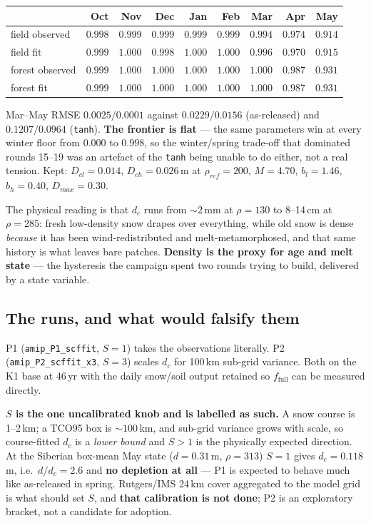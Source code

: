 \documentclass[10pt]{article}
\begin{document}
\begin{center}\footnotesize
\begin{tabular}{l r r r r r r r r}
\toprule
 & Oct & Nov & Dec & Jan & Feb & Mar & Apr & \textbf{May} \\
\midrule
field observed & $0.998$ & $0.999$ & $0.999$ & $0.999$ & $0.999$ & $0.994$ & $0.974$ & $\mathbf{0.914}$ \\
field fit & $0.999$ & $1.000$ & $0.998$ & $1.000$ & $1.000$ & $0.996$ & $0.970$ & $\mathbf{0.915}$ \\
forest observed & $0.999$ & $1.000$ & $1.000$ & $1.000$ & $1.000$ & $1.000$ & $0.987$ & $\mathbf{0.931}$ \\
forest fit & $0.999$ & $1.000$ & $1.000$ & $1.000$ & $1.000$ & $1.000$ & $0.987$ & $\mathbf{0.931}$ \\
\bottomrule
\end{tabular}
\end{center}

\noindent Mar--May RMSE $0.0025/0.0001$ against $0.0229/0.0156$ (as-released) and
$0.1207/0.0964$ (\texttt{tanh}). \textbf{The frontier is flat} --- the same parameters win at
every winter floor from $0.000$ to $0.998$, so the winter/spring trade-off that dominated
rounds 15--19 was an artefact of the \texttt{tanh} being unable to do either, not a real
tension. Kept: $D_{cl}=0.014$, $D_{ch}=0.026$\,m at $\rho_{ref}=200$, $M=4.70$, $b_l=1.46$,
$b_h=0.40$, $D_{max}=0.30$.

The physical reading is that $d_c$ runs from ${\sim}2$\,mm at $\rho=130$ to 8--14\,cm at
$\rho=285$: fresh low-density snow drapes over everything, while old snow is dense
\emph{because} it has been wind-redistributed and melt-metamorphosed, and that same history is
what leaves bare patches. \textbf{Density is the proxy for age and melt state} --- the
hysteresis the campaign spent two rounds trying to build, delivered by a state variable.

\subsection{The runs, and what would falsify them}\label{sub:r20runs}
P1 (\texttt{amip\_P1\_scffit}, $S=1$) takes the observations literally. P2
(\texttt{amip\_P2\_scffit\_x3}, $S=3$) scales $d_c$ for 100\,km sub-grid variance. Both on the
K1 base at 46\,yr with the daily snow/soil output retained so $f_{\text{full}}$ can be measured
directly.

\textbf{$S$ is the one uncalibrated knob and is labelled as such.} A snow course is 1--2\,km; a
TCO95 box is ${\sim}100$\,km, and sub-grid variance grows with scale, so course-fitted $d_c$ is
a \emph{lower bound} and $S>1$ is the physically expected direction. At the Siberian box-mean
May state ($d=0.31$\,m, $\rho=313$) $S=1$ gives $d_c=0.118$\,m, i.e.\ $d/d_c=2.6$ and
\textbf{no depletion at all} --- P1 is expected to behave much like as-released in spring.
Rutgers/IMS 24\,km cover aggregated to the model grid is what should set $S$, and
\textbf{that calibration is not done}; P2 is an exploratory bracket, not a candidate for
adoption.
\end{document}
